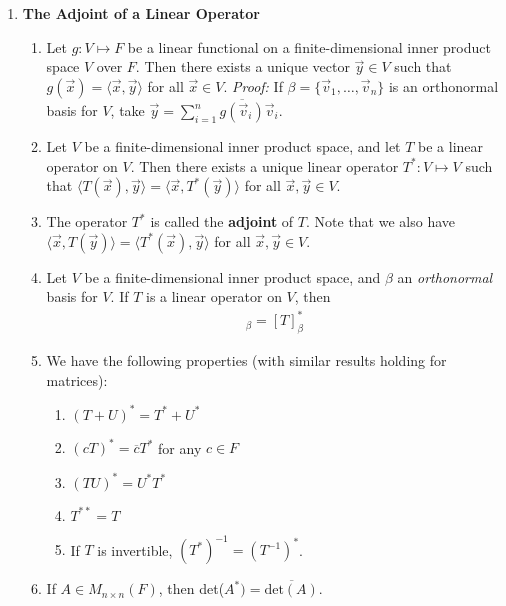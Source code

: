 \documentclass[10pt]{article}
\begin{document}
\begin{multicols*}{2}
\begin{enumerate}
\begin{enumerate}
    \end{enumerate}
    \item \textbf{The Adjoint of a Linear Operator}
    \begin{enumerate}
        \item Let $g:V \mapsto F$ be a linear functional on a finite-dimensional inner product space $V$ over $F$. Then there exists a unique vector $\vec{y} \in V$ such that $g(\vec{x}) = \langle \vec{x},\vec{y} \rangle$ for all $\vec{x} \in V$. \textit{Proof:} If $\beta = \{ \vec{v}_1, \hdots, \vec{v}_n \}$ is an orthonormal basis for $V$, take $\vec{y}=\sum_{i=1}^n \overline{g(\vec{v}_i)} \vec{v}_i$.
        \item Let $V$ be a finite-dimensional inner product space, and let $T$ be a linear operator on $V$. Then there exists a unique linear operator $T^*:V \mapsto V$ such that $\langle T(\vec{x}), \vec{y} \rangle = \langle \vec{x}, T^*(\vec{y}) \rangle$ for all $\vec{x}, \vec{y} \in V$.
        \item The operator $T^*$ is called the \textbf{adjoint} of $T$. Note that we also have $\langle \vec{x}, T(\vec{y}) \rangle = \langle T^*(\vec{x}), \vec{y} \rangle$ for all $\vec{x},\vec{y} \in V$. 
        \item Let $V$ be a finite-dimensional inner product space, and $\beta$ an \textit{orthonormal} basis for $V$. If $T$ is a linear operator on $V$, then 
        \begin{align*}
            [T^*]_\beta = [T]_\beta^*
        \end{align*}
        
        \item We have the following properties (with similar results holding for matrices):
        \begin{enumerate}
            \item $(T+U)^* = T^* + U^*$
            \item $(cT)^* = \overline{c}T^*$ for any $c \in F$
            \item $(TU)^* = U^*T^*$
            \item $T^{**} = T$
            \item If $T$ is invertible, $(T^*)^{-1} = (T^{-1})^{*}$.
        \end{enumerate}
        
        \item If $A \in M_{n \times n}(F)$, then det($A^*) = \overline{\text{det}(A)}$.
        

\end{enumerate}
\end{enumerate}
\end{multicols*}
\end{document}
